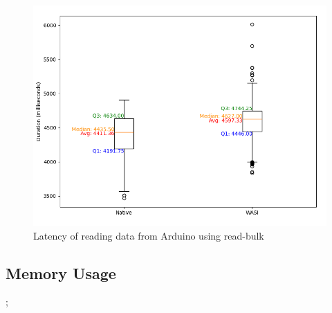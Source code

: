 \begin{figure}[H]
  \centering
  \includegraphics[width=1\textwidth]{images/mass_storage_1000_runs_optimized.png}
  \caption{Latency of reading data from Arduino using read-bulk}
  \label{fig:mass_storage_latency_optimized}
\end{figure}

\subsection{Memory Usage}
 
 
 ;